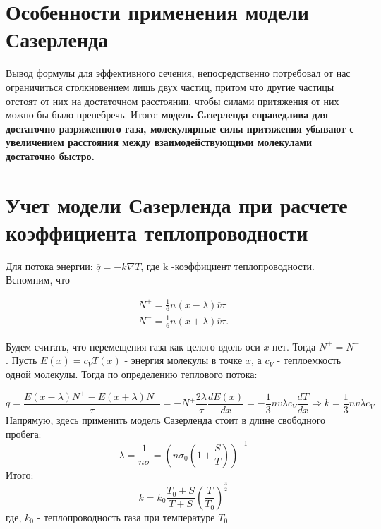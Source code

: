 \documentclass[a4paper, 12pt]{article}%
\begin{document}
	\section{Особенности применения модели Сазерленда}
	Вывод формулы для эффективного сечения, непосредственно потребовал от нас ограничиться столкновением лишь двух частиц, притом что другие частицы отстоят от них на достаточном расстоянии, чтобы силами притяжения от них можно бы было пренебречь. Итого: \textbf{модель Сазерленда справедлива для достаточно разряженного газа, молекулярные силы притяжения убывают с увеличением расстояния между взаимодействующими молекулами достаточно быстро.}
	\section{Учет модели Сазерленда при расчете коэффициента теплопроводности}
	Для потока энергии: $\overline{q} = -k \nabla T$, где k -коэффициент теплопроводности.
	Вспомним, что 
	
	\begin{eqnarray*}
		N^{+} = \frac16 n(x-\lambda)\overline{v} \tau \\
		N^{-} = \frac16 n(x+\lambda) \overline{v} \tau.
	\end{eqnarray*}
	
	Будем считать, что перемещения газа как целого вдоль оси $x$ нет. Тогда $N^{+} = N^{-}$. Пусть $E(x) = c_V T(x)$ - энергия молекулы в точке $x$, а $c_V$ - теплоемкость одной молекулы. Тогда по определению теплового потока:
	
	\begin{equation*}
		q = \frac{ E(x- \lambda)N^{+} - E(x+\lambda) N^{-}}{\tau} = - N^{+} \frac{2\lambda}{\tau} \frac{dE(x)}{dx} = -\frac13 n\overline{v} \lambda c_V \frac{dT}{dx} \Rightarrow k = \frac13 n \overline{v} \lambda c_V
	\end{equation*}
	Напрямую, здесь применить модель Сазерленда стоит в длине свободного пробега:
	$$\lambda = \frac{1}{n \sigma} = (n \sigma_0 (1+ \frac{S}{T}))^{-1}$$
	Итого:
	$$k = k_0 \frac{T_0 + S}{T + S} (\frac{T}{T_0})^{\frac{3}{2}}$$
	где, $k_0$ - теплопроводность газа при температуре $T_0$
\end{document}
